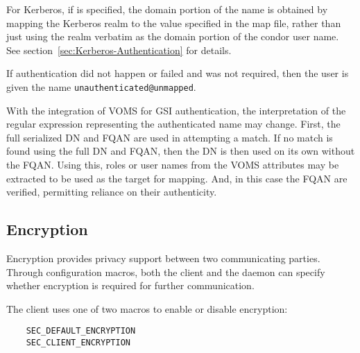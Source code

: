 For Kerberos, if  is specified, the domain portion
of the name is obtained by mapping the Kerberos realm to the value specified
in the map file, rather than just using the realm verbatim as the domain
portion of the condor user name.  See section~\ref{sec:Kerberos-Authentication}
for details.

If authentication did not happen or failed and was not required, then
the user is given the name \verb|unauthenticated@unmapped|.

With the integration of VOMS for GSI authentication,
the interpretation of the regular expression
representing the authenticated name may change.
First, the full serialized DN and FQAN are used in attempting a match.
If no match is found using the full DN and FQAN,
then the DN is then used on its own without the FQAN.
Using this, roles or user names from the VOMS attributes may be extracted
to be used as the target for mapping.
And, in this case the FQAN are verified, permitting reliance
on their authenticity.

\subsection{\label{sec:Security-Encryption}Encryption}
Encryption provides privacy support between two communicating parties.
Through configuration macros, both the client and the daemon
can specify whether encryption is required for further communication.

The client uses one of two macros to enable or disable encryption:
\begin{verbatim}
    SEC_DEFAULT_ENCRYPTION
    SEC_CLIENT_ENCRYPTION
\end{verbatim}

